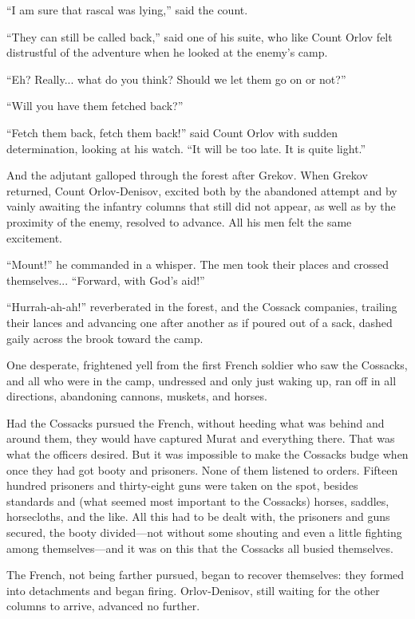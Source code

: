 ``I am sure that rascal was lying,'' said the count.

``They can still be called back,'' said one of his suite, who
like Count Orlov felt distrustful of the adventure when he looked
at the enemy's camp.

``Eh? Really... what do you think? Should we let them go on or
not?''

``Will you have them fetched back?''

``Fetch them back, fetch them back!'' said Count Orlov with
sudden determination, looking at his watch. ``It will be too
late. It is quite light.''

And the adjutant galloped through the forest after Grekov. When
Grekov returned, Count Orlov-Denisov, excited both by the
abandoned attempt and by vainly awaiting the infantry columns
that still did not appear, as well as by the proximity of the
enemy, resolved to advance. All his men felt the same excitement.

``Mount!'' he commanded in a whisper. The men took their places
and crossed themselves... ``Forward, with God's aid!''

``Hurrah-ah-ah!'' reverberated in the forest, and the Cossack
companies, trailing their lances and advancing one after another
as if poured out of a sack, dashed gaily across the brook toward
the camp.

One desperate, frightened yell from the first French soldier who
saw the Cossacks, and all who were in the camp, undressed and
only just waking up, ran off in all directions, abandoning
cannons, muskets, and horses.

Had the Cossacks pursued the French, without heeding what was
behind and around them, they would have captured Murat and
everything there. That was what the officers desired. But it was
impossible to make the Cossacks budge when once they had got
booty and prisoners. None of them listened to orders. Fifteen
hundred prisoners and thirty-eight guns were taken on the spot,
besides standards and (what seemed most important to the
Cossacks) horses, saddles, horsecloths, and the like. All this
had to be dealt with, the prisoners and guns secured, the booty
divided---not without some shouting and even a little fighting
among themselves---and it was on this that the Cossacks all
busied themselves.

The French, not being farther pursued, began to recover
themselves: they formed into detachments and began
firing. Orlov-Denisov, still waiting for the other columns to
arrive, advanced no further.

